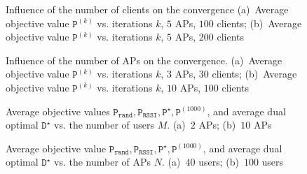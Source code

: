 \documentclass[journal, 10pt, twocolumn]{IEEEtran}
\begin{document}
\begin{figure}[t]
\centering
{}
\goodgap
{}\vspace{-2mm}
\caption{Influence of the number of clients on the convergence (a)~Average objective value $\texttt{P}^{(k)}$ vs. iterations $k$, $5$ APs, $100$ clients; (b)~Average objective value $\texttt{P}^{(k)}$ vs. iterations $k$, $5$ APs, $200$ clients}
\label{fig:Bound_illustration_all0}
\vspace{-0.4cm}
\end{figure}

\begin{figure}[t]
\centering
{}
\goodgap
{}\vspace{-2mm}
\caption{Influence of the number of APs on the convergence. (a)~Average objective value $\texttt{P}^{(k)}$ vs. iterations $k$, $3$ APs, $30$ clients; (b)~Average objective value $\texttt{P}^{(k)}$ vs. iterations $k$, $10$ APs, $100$ clients}
\label{fig:Bound_illustration_all1}
\vspace{-0.3cm}
\end{figure}

\begin{figure}[t]
\centering
{}
\goodgap
{}\vspace{-2mm}
\caption{Average objective values $\texttt{P}_{\texttt{rand}}, \texttt{P}_{\texttt{RSSI}}, \texttt{P}^\star, \texttt{P}^{(1000)}$, and average dual optimal $\texttt{D}^\star$  vs. the number of users $M$. (a)~$2$ APs; (b)~$10$ APs}
\label{fig:Bound_illustration_all2}
\vspace{-0.4cm}
\end{figure}


\begin{figure}[t]
\centering
{}
\goodgap
{}\vspace{-2mm}
\caption{Average objective value $\texttt{P}_{\texttt{rand}}, \texttt{P}_{\texttt{RSSI}}, \texttt{P}^\star, \texttt{P}^{(1000)}$, and average dual optimal $\texttt{D}^\star$ vs. the number of APs $N$. (a)~$40$ users; (b)~$100$ users}
\label{fig:Bound_illustration_all3}
\vspace{-0.4cm}
\end{figure}
\end{document}
